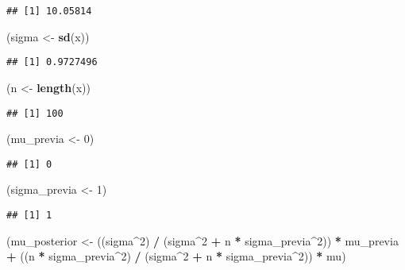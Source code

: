\documentclass[
  12pt,
]{book}
\newenvironment{Shaded}{\begin{snugshade}}{\end{snugshade}}
\newcommand{\DecValTok}[1]{\textcolor[rgb]{0.00,0.00,0.81}{#1}}
\newcommand{\KeywordTok}[1]{\textcolor[rgb]{0.13,0.29,0.53}{\textbf{#1}}}
\newcommand{\NormalTok}[1]{#1}
\newcommand{\OperatorTok}[1]{\textcolor[rgb]{0.81,0.36,0.00}{\textbf{#1}}}
\newcommand{\StringTok}[1]{\textcolor[rgb]{0.31,0.60,0.02}{#1}}
\begin{document}
\begin{verbatim}
## [1] 10.05814
\end{verbatim}

\begin{Shaded}
\begin{Highlighting}[]
\NormalTok{(sigma \textless{}{-}}\StringTok{ }\KeywordTok{sd}\NormalTok{(x))}
\end{Highlighting}
\end{Shaded}

\begin{verbatim}
## [1] 0.9727496
\end{verbatim}

\begin{Shaded}
\begin{Highlighting}[]
\NormalTok{(n \textless{}{-}}\StringTok{ }\KeywordTok{length}\NormalTok{(x))}
\end{Highlighting}
\end{Shaded}

\begin{verbatim}
## [1] 100
\end{verbatim}

\begin{Shaded}
\begin{Highlighting}[]
\NormalTok{(mu\_previa \textless{}{-}}\StringTok{ }\DecValTok{0}\NormalTok{)}
\end{Highlighting}
\end{Shaded}

\begin{verbatim}
## [1] 0
\end{verbatim}

\begin{Shaded}
\begin{Highlighting}[]
\NormalTok{(sigma\_previa \textless{}{-}}\StringTok{ }\DecValTok{1}\NormalTok{)}
\end{Highlighting}
\end{Shaded}

\begin{verbatim}
## [1] 1
\end{verbatim}

\begin{Shaded}
\begin{Highlighting}[]
\NormalTok{(mu\_posterior \textless{}{-}}\StringTok{ }\NormalTok{((sigma}\OperatorTok{\^{}}\DecValTok{2}\NormalTok{) }\OperatorTok{/}\StringTok{ }\NormalTok{(sigma}\OperatorTok{\^{}}\DecValTok{2} \OperatorTok{+}\StringTok{ }\NormalTok{n }\OperatorTok{*}\StringTok{ }\NormalTok{sigma\_previa}\OperatorTok{\^{}}\DecValTok{2}\NormalTok{)) }\OperatorTok{*}\StringTok{ }\NormalTok{mu\_previa }\OperatorTok{+}\StringTok{ }\NormalTok{((n }\OperatorTok{*}\StringTok{ }\NormalTok{sigma\_previa}\OperatorTok{\^{}}\DecValTok{2}\NormalTok{) }\OperatorTok{/}\StringTok{ }\NormalTok{(sigma}\OperatorTok{\^{}}\DecValTok{2} \OperatorTok{+}\StringTok{ }\NormalTok{n }\OperatorTok{*}\StringTok{ }\NormalTok{sigma\_previa}\OperatorTok{\^{}}\DecValTok{2}\NormalTok{)) }\OperatorTok{*}\StringTok{ }\NormalTok{mu)}
\end{Highlighting}
\end{Shaded}
\end{document}
